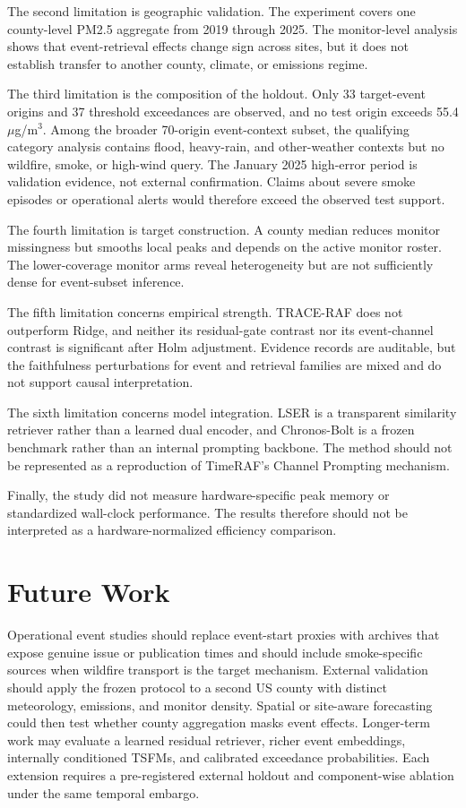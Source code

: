 \documentclass{ieeeaccess}
\begin{document}
The second limitation is geographic validation. The experiment covers one
county-level PM2.5 aggregate from 2019 through 2025. The monitor-level analysis
shows that event-retrieval effects change sign across sites, but it does not
establish transfer to another county, climate, or emissions regime.

The third limitation is the composition of the holdout. Only 33 target-event
origins and 37 threshold exceedances are observed, and no test origin exceeds
55.4 $\mu$g/m$^3$. Among the broader 70-origin event-context subset, the
qualifying category analysis contains flood, heavy-rain, and other-weather
contexts but no wildfire, smoke, or high-wind query. The January 2025
high-error period is validation evidence, not external confirmation. Claims
about severe smoke episodes or operational alerts would therefore exceed the
observed test support.

The fourth limitation is target construction. A county median reduces monitor
missingness but smooths local peaks and depends on the active monitor roster.
The lower-coverage monitor arms reveal heterogeneity but are not sufficiently
dense for event-subset inference.

The fifth limitation concerns empirical strength. TRACE-RAF does not outperform
Ridge, and neither its residual-gate contrast nor its event-channel contrast is
significant after Holm adjustment. Evidence records are auditable, but the
faithfulness perturbations for event and retrieval families are mixed and do not
support causal interpretation.

The sixth limitation concerns model integration. LSER is a transparent
similarity retriever rather than a learned dual encoder, and Chronos-Bolt is a
frozen benchmark rather than an internal prompting backbone. The method should
not be represented as a reproduction of TimeRAF's Channel Prompting mechanism.

Finally, the study did not measure hardware-specific peak memory or standardized
wall-clock performance. The results therefore should not be interpreted as a
hardware-normalized efficiency comparison.

\section{Future Work}

Operational event studies should replace event-start proxies with archives that
expose genuine issue or publication times and should include smoke-specific
sources when wildfire transport is the target mechanism. External validation
should apply the frozen protocol to a second US county with distinct
meteorology, emissions, and monitor density. Spatial or site-aware forecasting
could then test whether county aggregation masks event effects. Longer-term
work may evaluate a learned residual retriever, richer event embeddings,
internally conditioned TSFMs, and calibrated exceedance probabilities. Each
extension requires a pre-registered external holdout and component-wise
ablation under the same temporal embargo.
\end{document}
